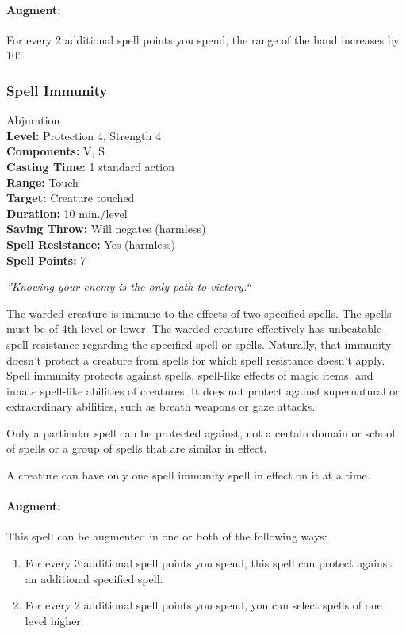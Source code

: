\paragraph{Augment:} For every 2 additional spell points you spend, the range of the hand increases by 10'.
\subsubsection{Spell Immunity}
\label{Spell:SpellImmunity}
Abjuration
\\ \textbf{Level:} Protection 4, Strength 4
\\ \textbf{Components:} V, S
\\ \textbf{Casting Time:} 1 standard action
\\ \textbf{Range:} Touch
\\ \textbf{Target:} Creature touched
\\ \textbf{Duration:} 10 min./level
\\ \textbf{Saving Throw:} Will negates (harmless)
\\ \textbf{Spell Resistance:} Yes (harmless)
\\ \textbf{Spell Points:} 7

\emph{''Knowing your enemy is the only path to victory.``}

The warded creature is immune to the effects of two specified spells. 
The spells must be of 4th level or lower. 
The warded creature effectively has unbeatable spell resistance regarding the specified spell or spells. 
Naturally, that immunity doesn't protect a creature from spells for which spell resistance doesn't apply. 
Spell immunity protects against spells, spell-like effects of magic items, and innate spell-like abilities of creatures. 
It does not protect against supernatural or extraordinary abilities, such as breath weapons or gaze attacks.

Only a particular spell can be protected against, not a certain domain or school of spells or a group of spells that are similar in effect.

A creature can have only one spell immunity spell in effect on it at a time.

\paragraph{Augment:} This spell can be augmented in one or both of the following ways:
\begin{enumerate}
 \item For every 3 additional spell points you spend, this spell can protect against an additional specified spell.
 \item For every 2 additional spell points you spend, you can select spells of one level higher.
\end{enumerate}

